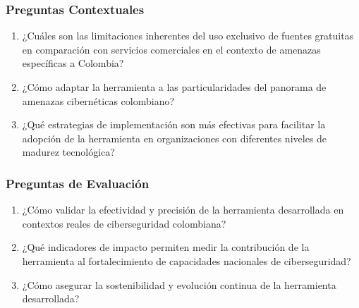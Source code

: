 \subsubsection{Preguntas Contextuales}
\begin{enumerate}
    \item ¿Cuáles son las limitaciones inherentes del uso exclusivo de fuentes gratuitas en comparación con servicios comerciales en el contexto de amenazas específicas a Colombia?
    \item ¿Cómo adaptar la herramienta a las particularidades del panorama de amenazas cibernéticas colombiano?
    \item ¿Qué estrategias de implementación son más efectivas para facilitar la adopción de la herramienta en organizaciones con diferentes niveles de madurez tecnológica?
\end{enumerate}

\subsubsection{Preguntas de Evaluación}
\begin{enumerate}
    \item ¿Cómo validar la efectividad y precisión de la herramienta desarrollada en contextos reales de ciberseguridad colombiana?
    \item ¿Qué indicadores de impacto permiten medir la contribución de la herramienta al fortalecimiento de capacidades nacionales de ciberseguridad?
    \item ¿Cómo asegurar la sostenibilidad y evolución continua de la herramienta desarrollada?
\end{enumerate}
